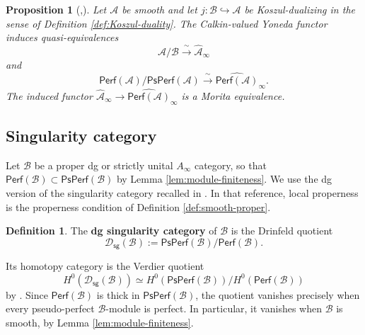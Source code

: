 \documentclass[11pt,letterpaper,reqno]{amsart}
\theoremstyle{plain}
\newtheorem{proposition}[proposition]{Proposition}
\theoremstyle{definition}
\newtheorem{definition}[definition]{Definition}
\theoremstyle{plain}
\theoremstyle{definition}
\numberwithin{equation}{section}
\begin{document}
\begin{proposition}[{\cite[Proposition 9.3]{Efimov2017},\cite[Proposition 2.13]{Ganatra-Gao-Venkatesh2022}}] \label{prop:boundary-quotient}
Let $\mathscr A$ be smooth and let $j:\mathscr B\hookrightarrow\mathscr A$ be Koszul-dualizing in the sense of Definition \ref{def:Koszul-duality}.
The Calkin-valued Yoneda functor induces quasi-equivalences
\begin{equation}\label{eq:boundary-quotient}
\mathscr A/\mathscr B\xrightarrow{\;\sim\;}\widehat{\mathscr A}_{\infty}
\end{equation}
and
\begin{equation}\label{eq:perf-boundary-quotient}
\mathsf{Perf}(\mathscr A)/\mathsf{PsPerf}(\mathscr A)
\xrightarrow{\;\sim\;}\widehat{\mathsf{Perf}(\mathscr A)}_{\infty}.
\end{equation}
The induced functor $\widehat{\mathscr A}_{\infty}\to\widehat{\mathsf{Perf}(\mathscr A)}_{\infty}$ is a Morita equivalence.
\end{proposition}

\subsection{Singularity category}\label{subsec:singularity}

Let $\mathscr B$ be a proper dg or strictly unital $A_\infty$ category, so that $\mathsf{Perf}(\mathscr B)\subset\mathsf{PsPerf}(\mathscr B)$ by Lemma \ref{lem:module-finiteness}.
We use the dg version of the singularity category recalled in \cite[Section 2.1]{Efimov2017}.
In that reference, local properness is the properness condition of Definition \ref{def:smooth-proper}.

\begin{definition}\label{def:dg-singularity}
The \textbf{dg singularity category} of $\mathscr B$ is the Drinfeld quotient
\begin{equation}\label{eq:dg-singularity}
\mathscr D_{\mathsf{sg}}(\mathscr B)
:=\mathsf{PsPerf}(\mathscr B)/\mathsf{Perf}(\mathscr B).
\end{equation}
\end{definition}

Its homotopy category is the Verdier quotient
\[
H^0(\mathscr D_{\mathsf{sg}}(\mathscr B))
\simeq H^0(\mathsf{PsPerf}(\mathscr B))/H^0(\mathsf{Perf}(\mathscr B))
\]
by \cite[Theorem 3.4]{Drinfeld2004}.
Since $\mathsf{Perf}(\mathscr B)$ is thick in $\mathsf{PsPerf}(\mathscr B)$, the quotient vanishes precisely when every pseudo-perfect $\mathscr B$-module is perfect.
In particular, it vanishes when $\mathscr B$ is smooth, by Lemma \ref{lem:module-finiteness}.
\end{document}
